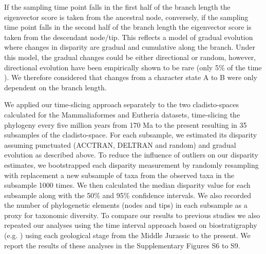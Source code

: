 \documentclass[12pt,letterpaper]{article}
\begin{document}
\begin{enumerate}
    If the sampling time point falls in the first half of the branch length the eigenvector score is taken from the ancestral node, conversely, if the sampling time point falls in the second half of the branch length the eigenvector score is taken from the descendant node/tip.
    This reflects a model of gradual evolution where changes in disparity are gradual and cumulative along the branch.
    Under this model, the gradual changes could be either directional or random, however, directional evolution have been empirically shown to be rare (only 5\% of the time \cite{Hunt21042015}).
    We therefore considered that changes from a character state A to B were only dependent on the branch length.
\end{enumerate}
We applied our time-slicing approach separately to the two cladisto-spaces calculated for the Mammaliaformes and Eutheria datasets, time-slicing the phylogeny every five million years from 170 Ma to the present resulting in 35 subsamples of the cladisto-space.
For each subsample, we estimated its disparity assuming punctuated (ACCTRAN, DELTRAN and random) and gradual evolution as described above.
To reduce the influence of outliers on our disparity estimates, we bootstrapped each disparity measurement by randomly resampling with replacement a new subsample of taxa from the observed taxa in the subsample 1000 times.
We then calculated the median disparity value for each subsample along with the 50\% and 95\% confidence intervals.
We also recorded the number of phylogenetic elements (nodes and tips) in each subsample as a proxy for taxonomic diversity.
To compare our results to previous studies we also repeated our analyses using the time interval approach based on biostratigraphy (e.g. \cite{Brusatte12092008}) using each geological stage from the Middle Jurassic to the present.
We report the results of these analyses in the Supplementary Figures S6 to S9.

\end{document}
